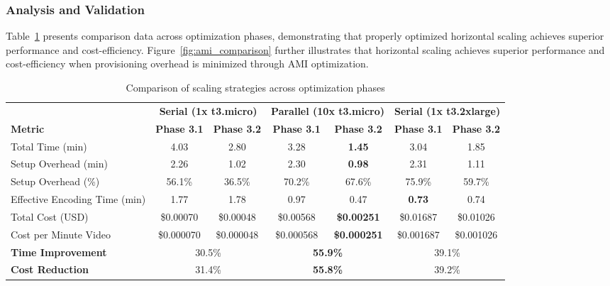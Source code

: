 \documentclass[conference]{IEEEtran}
\begin{document}
	\subsubsection{Analysis and Validation}
	
	Table~\ref{tab:unified_case_study} presents comparison data across optimization phases, demonstrating that properly optimized horizontal scaling achieves superior performance and cost-efficiency. Figure~\ref{fig:ami_comparison} further illustrates that horizontal scaling achieves superior performance and cost-efficiency when provisioning overhead is minimized through AMI optimization.
	
	\begin{table}[!htpb]
		\centering
		\caption{Comparison of scaling strategies across optimization phases}
		\label{tab:unified_case_study}
		\begin{tabular*}{\textwidth}{l @{\extracolsep{\fill}} | cc | cc | cc}
			\toprule
			& \multicolumn{2}{c|}{\textbf{Serial (1x t3.micro)}} & \multicolumn{2}{c|}{\textbf{Parallel (10x t3.micro)}} & \multicolumn{2}{c}{\textbf{Serial (1x t3.2xlarge)}} \\
			\cmidrule(lr){2-3} \cmidrule(lr){4-5} \cmidrule(lr){6-7}
			\textbf{Metric} & \textbf{Phase 3.1} & \textbf{Phase 3.2} & \textbf{Phase 3.1} & \textbf{Phase 3.2} & \textbf{Phase 3.1} & \textbf{Phase 3.2} \\
			\midrule
			Total Time (min)          & 4.03  & 2.80  & 3.28 & \textbf{1.45} & 3.04 & 1.85 \\
			Setup Overhead (min)      & 2.26  & 1.02  & 2.30 & \textbf{0.98} & 2.31 & 1.11 \\
			Setup Overhead (\%)       & 56.1\% & 36.5\% & 70.2\% & 67.6\% & 75.9\% & 59.7\% \\
			Effective Encoding Time (min) & 1.77  & 1.78  & 0.97 & 0.47 & \textbf{0.73} & 0.74 \\
			\midrule
			Total Cost (USD)          & \$0.00070 & \$0.00048 & \$0.00568 & \textbf{\$0.00251} & \$0.01687 & \$0.01026 \\
			Cost per Minute Video     & \$0.000070 & \$0.000048 & \$0.000568 & \textbf{\$0.000251} & \$0.001687 & \$0.001026 \\
			\midrule \midrule
			\textbf{Time Improvement} & \multicolumn{2}{c|}{30.5\%} & \multicolumn{2}{c|}{\textbf{55.9\%}} & \multicolumn{2}{c}{39.1\%} \\
			\textbf{Cost Reduction}   & \multicolumn{2}{c|}{31.4\%} & \multicolumn{2}{c|}{\textbf{55.8\%}} & \multicolumn{2}{c}{39.2\%} \\
			\bottomrule
		\end{tabular*}
	\end{table}
	
\end{document}
